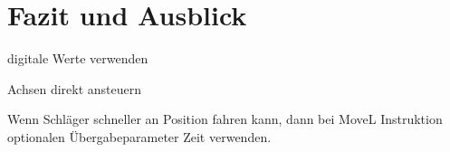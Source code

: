 
\chapter{Fazit und Ausblick}

digitale Werte verwenden 

Achsen direkt ansteuern

Wenn Schläger schneller an Position fahren kann, dann bei MoveL Instruktion optionalen Übergabeparameter Zeit verwenden.